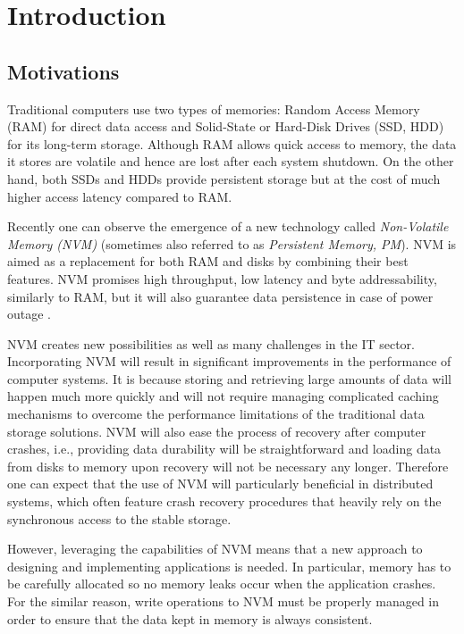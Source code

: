 \chapter{Introduction} \label{Introduction}

\section{Motivations}

Traditional computers use two types of memories: Random Access Memory (RAM) for direct data access and Solid-State or Hard-Disk Drives (SSD, HDD) for its long-term storage. Although RAM allows quick access to memory, the data it stores are volatile and hence are lost after each system shutdown. On the other hand, both SSDs and HDDs provide persistent storage but at the cost of much higher access latency compared to RAM.

Recently one can observe the emergence of a new technology called \emph{Non-Volatile Memory (NVM)} (sometimes also referred to as \emph{Persistent Memory, PM}). NVM is aimed as a replacement for both RAM and disks by combining their best features. NVM promises high throughput, low latency and byte addressability, similarly to RAM, but it will also guarantee data persistence in case of power outage \cite{NvmPerformanceArticle} . 

NVM creates new possibilities as well as many challenges in the IT sector. Incorporating NVM will result in significant improvements in the performance of computer systems. It is because storing and retrieving large amounts of data will happen much more quickly and will not require managing complicated caching mechanisms to overcome the performance limitations of the traditional data storage solutions. NVM will also ease the process of recovery after computer crashes, i.e., providing data durability will be straightforward and loading data from disks to memory upon recovery will not be necessary any longer. Therefore one can expect that the use of NVM will particularly beneficial in distributed systems, which often feature crash recovery procedures that heavily rely on the synchronous access to the stable storage. 

However, leveraging the capabilities of NVM means that a new approach to designing and implementing applications is needed. In particular, memory has to be carefully allocated so no memory leaks occur when the application crashes. For the similar reason, write operations to NVM must be properly managed in order to ensure that the data kept in memory is always consistent.

